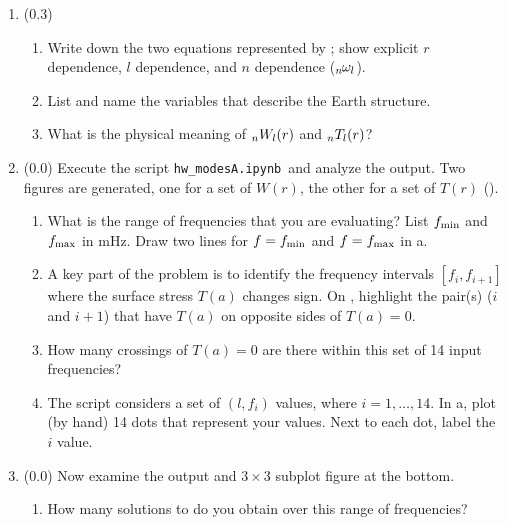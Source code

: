 \documentclass[11pt,titlepage,fleqn]{article}
\newcommand{\tfilemain}{{\tt hw\_modesA.ipynb}}
\begin{document}
\begin{enumerate}
\item (0.3)
%
\begin{enumerate}
\item Write down the two equations represented by ; show explicit $r$ dependence, $l$ dependence, and $n$ dependence (\eg $\mbox{${}_{n\hspace{-0.2 mm}}\omega_l$}$).
\item List and name the variables that describe the Earth structure.

\item What is the physical meaning of $\mbox{${}_nW_l$}(r)$ and $\mbox{${}_nT_l$}(r)$?
\end{enumerate}


\item (0.0) Execute the script \tfilemain\ and analyze the output. Two figures are generated, one for a set of $W(r)$, the other for a set of $T(r)$ ().
%
\begin{enumerate}
\item What is the range of frequencies that you are evaluating? List $f_{\rm min}$ and $f_{\rm max}$ in mHz. Draw two lines for $f = f_{\rm min}$ and $f = f_{\rm max}$ in a.

\item A key part of the problem is to identify the frequency intervals $[f_i, f_{i+1}]$ where the surface stress $T(a)$ changes sign. On , highlight the pair(s) ($i$ and $i+1$) that have $T(a)$ on opposite sides of $T(a) = 0$.

\item How many crossings of $T(a) = 0$ are there within this set of 14 input frequencies?

\item The script considers a set of $(l, f_i)$ values, where $i = 1, \ldots, 14$. In a, plot (by hand) 14 dots that represent your values. Next to each dot, label the $i$ value.

\end{enumerate}

\label{prob:Tr}


\item (0.0) Now examine the output and $3 \times 3$ subplot figure at the bottom.
%
\begin{enumerate}
\item How many solutions to  do you obtain over this range of frequencies?


\end{enumerate}
\end{enumerate}
\end{document}
